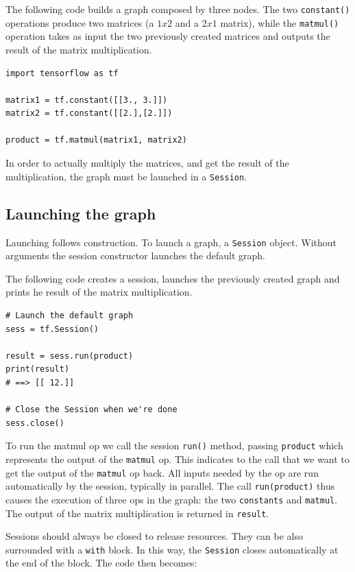 The following code builds a graph composed by three nodes. The two \lstinline|constant()| operations produce two matrices (a $1x2$ and a $2x1$ matrix), while the \lstinline|matmul()| operation takes as input the two previously created matrices and outputs the result of the matrix multiplication.

\begin{lstlisting}
import tensorflow as tf

matrix1 = tf.constant([[3., 3.]])
matrix2 = tf.constant([[2.],[2.]])

product = tf.matmul(matrix1, matrix2)
\end{lstlisting}

In order to actually multiply the matrices, and get the result of the multiplication, the graph must be launched in a \lstinline|Session|.

\subsection{Launching the graph}

Launching follows construction. To launch a graph, a \lstinline|Session| object. Without arguments the session constructor launches the default graph.

The following code creates a session, launches the previously created graph and prints he result of the matrix multiplication.

\begin{lstlisting}
# Launch the default graph
sess = tf.Session()

result = sess.run(product)
print(result)
# ==> [[ 12.]]

# Close the Session when we're done
sess.close()
\end{lstlisting}

To run the matmul op we call the session \lstinline|run()| method, passing \lstinline|product| which represents the output of the \lstinline|matmul| op. This indicates to the call that we want to get the output of the \lstinline|matmul| op back. All inputs needed by the op are run automatically by the session, typically in parallel. The call \lstinline|run(product)| thus causes the execution of three ops in the graph: the two \lstinline|constants| and \lstinline|matmul|. The output of the matrix multiplication is returned in \lstinline|result|.

Sessions should always be closed to release resources.  They can be also surrounded with a \lstinline|with| block. In this way, the \lstinline|Session| closes automatically at the end of the block. The code then becomes:

